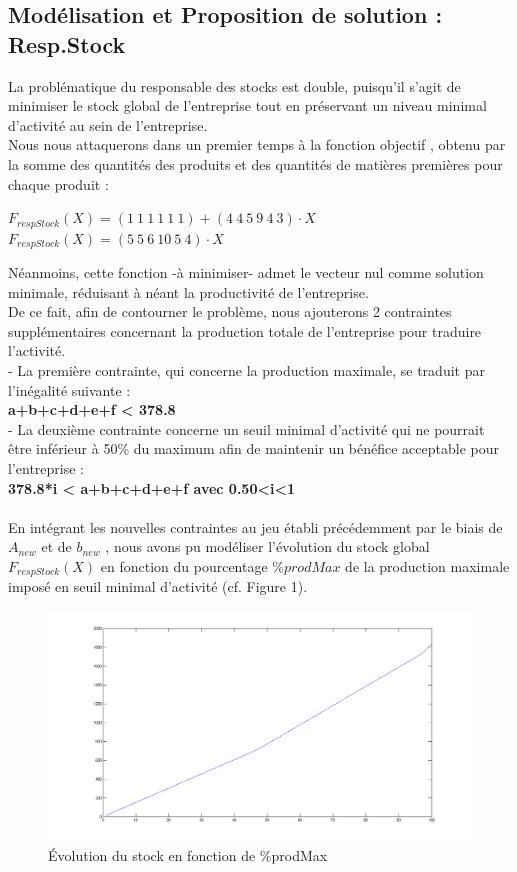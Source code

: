 \documentclass[a4paper, 11pt]{article}
\begin{document}
\subsection{Modélisation et Proposition de solution : Resp.Stock}
La problématique du responsable des stocks est double, puisqu'il s'agit de minimiser le stock global de l'entreprise tout en préservant un niveau minimal d'activité au sein de l'entreprise.\\
Nous nous attaquerons dans un premier temps à la fonction objectif , obtenu par la somme des quantités des produits et des quantités de matières premières pour chaque produit :
\begin{center}
$F_{respStock} (X) =(1~1~1~1~1~1)+(4~4~5~9~4~3)\cdot X$ \\
$F_{respStock} (X) =(5~5~6~10~5~4)\cdot X$\\
\end{center}
Néanmoins, cette fonction -à minimiser- admet le vecteur nul comme solution minimale, réduisant à néant la productivité de l'entreprise.\\
De ce fait, afin de contourner le problème, nous ajouterons 2 contraintes supplémentaires concernant la production totale de l'entreprise pour traduire l'activité.\\
- La première contrainte, qui concerne la production maximale, se traduit par l'inégalité suivante :\\
\textbf{a+b+c+d+e+f < 378.8}\\
- La deuxième contrainte concerne un seuil minimal d'activité qui ne pourrait être inférieur à 50\% du maximum afin de maintenir un bénéfice acceptable pour l'entreprise :\\
\textbf{ 378.8*i < a+b+c+d+e+f avec 0.50<i<1}\\
\\
En intégrant les nouvelles contraintes au jeu établi précédemment par le biais de \textbf{$A_{new}$} et de \textbf{$b_{new}$} , nous avons pu modéliser l'évolution du stock global $F_{respStock} (X)$ en fonction du pourcentage $\%prodMax$ de la production maximale imposé en seuil minimal d'activité (cf. Figure 1).\\
\begin{figure}[position]
    \begin{center}
        \includegraphics[scale=0.35]{Stock}
        \caption{
            \label{fig} Évolution du stock en fonction de \%prodMax
        }
    \end{center}
\end{figure}
\end{document}
